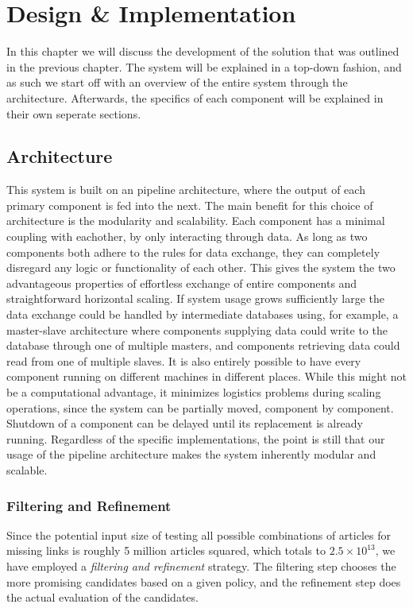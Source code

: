 \chapter{Design \& Implementation}\label{chap:design}
In this chapter we will discuss the development of the solution that was outlined in the previous chapter. The system will be explained in a top-down fashion, and as such we start off with an overview of the entire system through the architecture. Afterwards, the specifics of each component will be explained in their own seperate sections.

\section{Architecture}\label{sec:design_overview}
This system is built on an pipeline architecture, where the output of each primary component is fed into the next. The main benefit for this choice of architecture is the modularity and scalability. Each component has a minimal coupling with eachother, by only interacting through data. As long as two components both adhere to the rules for data exchange, they can completely disregard any logic or functionality of each other. This gives the system the two advantageous properties of effortless exchange of entire components and straightforward horizontal scaling. If system usage grows sufficiently large the data exchange could be handled by intermediate databases using, for example, a master-slave architecture where components supplying data could write to the database through one of multiple masters, and components retrieving data could read from one of multiple slaves. It is also entirely possible to have every component running on different machines in different places. While this might not be a computational advantage, it minimizes logistics problems during scaling operations, since the system can be partially moved, component by component. Shutdown of a component can be delayed until its replacement is already running. Regardless of the specific implementations, the point is still that our usage of the pipeline architecture makes the system inherently modular and scalable.

\subsection{Filtering and Refinement}
Since the potential input size of testing all possible combinations of articles for missing links is roughly 5 million articles squared, which totals to $2.5 \times 10^{13}$, we have employed a \emph{filtering and refinement} strategy. The filtering step chooses the more promising candidates based on a given policy, and the refinement step does the actual evaluation of the candidates.


